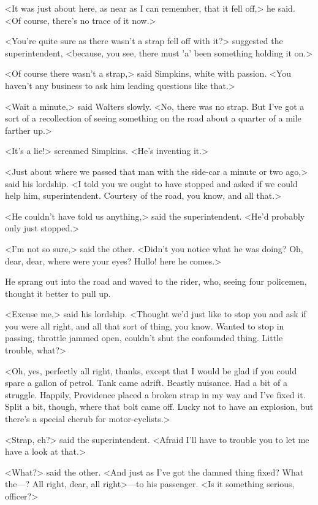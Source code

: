 <It was just about here, as near as I can remember, that it fell off,> he said. <Of course, there's no trace of it now.>

<You're quite sure as there wasn't a strap fell off with it?> suggested the superintendent, <because, you see, there must 'a' been something holding it on.>

<Of course there wasn't a strap,> said Simpkins, white with passion. <You haven't any business to ask him leading questions like that.>

<Wait a minute,> said Walters slowly. <No, there was no strap. But I've got a sort of a recollection of seeing something on the road about a quarter of a mile farther up.>

<It's a lie!> screamed Simpkins. <He's inventing it.>

<Just about where we passed that man with the side-car a minute or two ago,> said his lordship. <I told you we ought to have stopped and asked if we could help him, superintendent. Courtesy of the road, you know, and all that.>

<He couldn't have told us anything,> said the superintendent. <He'd probably only just stopped.>

<I'm not so sure,> said the other. <Didn't you notice what he was doing? Oh, dear, dear, where were your eyes? Hullo! here he comes.>

He sprang out into the road and waved to the rider, who, seeing four policemen, thought it better to pull up.

<Excuse me,> said his lordship. <Thought we'd just like to stop you and ask if you were all right, and all that sort of thing, you know. Wanted to stop in passing, throttle jammed open, couldn't shut the confounded thing. Little trouble, what?>

<Oh, yes, perfectly all right, thanks, except that I would be glad if you could spare a gallon of petrol. Tank came adrift. Beastly nuisance. Had a bit of a struggle. Happily, Providence placed a broken strap in my way and I've fixed it. Split a bit, though, where that bolt came off. Lucky not to have an explosion, but there's a special cherub for motor-cyclists.>

<Strap, eh?> said the superintendent. <Afraid I'll have to trouble you to let me have a look at that.>

<What?> said the other. <And just as I've got the damned thing fixed? What the—? All right, dear, all right>—to his passenger. <Is it something serious, officer?>

